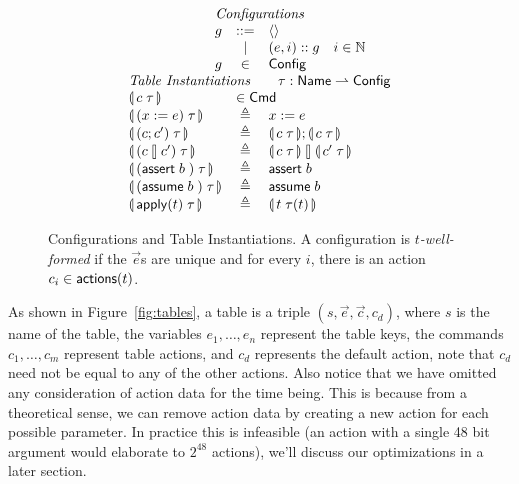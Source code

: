 \begin{figure}[ht]
  \[\begin{array}{l c l}
      \multicolumn{3}{c}{\textit{Configurations}} \\
      \multicolumn 1 r g & ::= & \langle\rangle \\
        & \mid & (e,i)::g \quad i \in \mathbb N \\
      \multicolumn 1 r g & \in & \mathsf{Config}\\
      \multicolumn 3 l {\textit{Table Instantiations} \qquad \tau : \Name \rightharpoonup \mathsf{Config}}\\
      \parenbb{c\; \tau} &\multicolumn 2 l {\in \mathsf{Cmd}} \\
      \parenbb{(x:= e)\; \tau} &\triangleq& x := e \\
      \parenbb{(c;c')\; \tau} &\triangleq& \parenbb{c\; \tau};\parenbb{c\; \tau} \\
      \parenbb{(c\angel c')\; \tau} &\triangleq& \parenbb{c\; \tau} \angel \parenbb{c'\; \tau}\\
      \parenbb{(\assert b)\; \tau} &\triangleq& \assert b \\
      \parenbb{(\assume b)\; \tau} &\triangleq& \assume b \\
      \parenbb{\apply t\; \tau} &\triangleq& \parenbb{t\; \tau(t)}
    \end{array}\]

  \caption{Configurations and Table Instantiations. A configuration is
    \emph{$t$-well-formed} if the $\vec e$s are unique and for every
    $i$, there is an action $c_i \in \mathsf{actions}(t)$.}
  \label{fig:configs}

  
  
\end{figure}



As shown in Figure~\ref{fig:tables}, a table is a triple
$(s, \vec e, \vec c, c_d)$, where $s$ is the name of the table, the variables
$e_1,\ldots,e_n$ represent the table keys, the commands $c_1,\ldots, c_m$
represent table actions, and $c_d$ represents the default action, note that
$c_d$ need not be equal to any of the other actions. Also notice that we have
omitted any consideration of action data for the time being. This is because
from a theoretical sense, we can remove action data by creating a new action for
each possible parameter. In practice this is infeasible (an action with a single
48 bit argument would elaborate to $2^{48}$ actions), we'll discuss our
optimizations in a later section.

